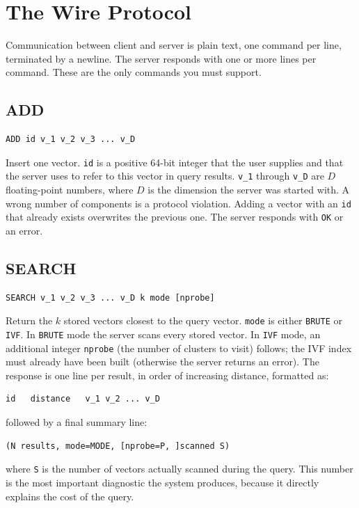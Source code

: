 \documentclass[11pt,a4paper]{article}
\begin{document}
\section{The Wire Protocol}

Communication between client and server is plain text, one command per line, terminated by a newline. The server responds with one or more lines per command. These are the only commands you must support.

\subsection{ADD}
\begin{codebox}
\begin{lstlisting}
ADD id v_1 v_2 v_3 ... v_D
\end{lstlisting}
\end{codebox}
Insert one vector. \texttt{id} is a positive 64-bit integer that the user supplies and that the server uses to refer to this vector in query results. \texttt{v\_1} through \texttt{v\_D} are $D$ floating-point numbers, where $D$ is the dimension the server was started with. A wrong number of components is a protocol violation. Adding a vector with an \texttt{id} that already exists overwrites the previous one. The server responds with \texttt{OK} or an error.

\subsection{SEARCH}
\begin{codebox}
\begin{lstlisting}
SEARCH v_1 v_2 v_3 ... v_D k mode [nprobe]
\end{lstlisting}
\end{codebox}
Return the $k$ stored vectors closest to the query vector. \texttt{mode} is either \texttt{BRUTE} or \texttt{IVF}. In \texttt{BRUTE} mode the server scans every stored vector. In \texttt{IVF} mode, an additional integer \texttt{nprobe} (the number of clusters to visit) follows; the IVF index must already have been built (otherwise the server returns an error). The response is one line per result, in order of increasing distance, formatted as:
\begin{codebox}
\begin{lstlisting}
id   distance   v_1 v_2 ... v_D
\end{lstlisting}
\end{codebox}
followed by a final summary line:
\begin{codebox}
\begin{lstlisting}
(N results, mode=MODE, [nprobe=P, ]scanned S)
\end{lstlisting}
\end{codebox}
where \texttt{S} is the number of vectors actually scanned during the query. This number is the most important diagnostic the system produces, because it directly explains the cost of the query.
\end{document}
